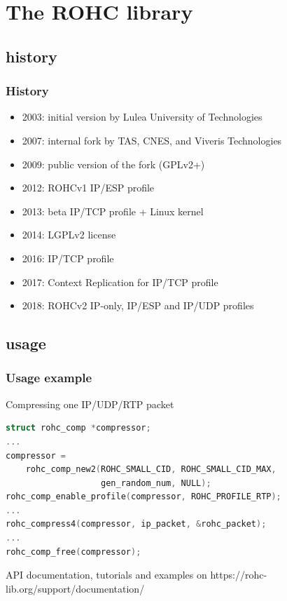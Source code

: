 \documentclass[utf8]{beamer}
\begin{document}


\section{The ROHC library}

\subsection{history}
\begin{frame}
	\frametitle{History}
	\begin{block}{}
		\begin{itemize}
			\item 2003: initial version by Lulea University of Technologies
			\item 2007: internal fork by TAS, CNES, and Viveris Technologies
			\item 2009: public version of the fork (GPLv2+)
				\pause
			\item 2012: ROHCv1 IP/ESP profile
			\item 2013: beta IP/TCP profile + Linux kernel
			\item 2014: LGPLv2 license
				\pause
			\item 2016: IP/TCP profile
			\item 2017: Context Replication for IP/TCP profile
			\item 2018: ROHCv2 IP-only, IP/ESP and IP/UDP profiles
		\end{itemize}
	\end{block}
\end{frame}

\subsection{usage}
\begin{frame}[fragile]
	\frametitle{Usage example}
	\begin{block}{Compressing one IP/UDP/RTP packet}
	\begin{lstlisting}[language=C]
struct rohc_comp *compressor;
...
compressor =
	rohc_comp_new2(ROHC_SMALL_CID, ROHC_SMALL_CID_MAX,
	               gen_random_num, NULL);
rohc_comp_enable_profile(compressor, ROHC_PROFILE_RTP);
...
rohc_compress4(compressor, ip_packet, &rohc_packet);
...
rohc_comp_free(compressor);
	\end{lstlisting}
	\end{block}
	\scriptsize{API documentation, tutorials and examples on https://rohc-lib.org/support/documentation/}
\end{frame}
\end{document}
